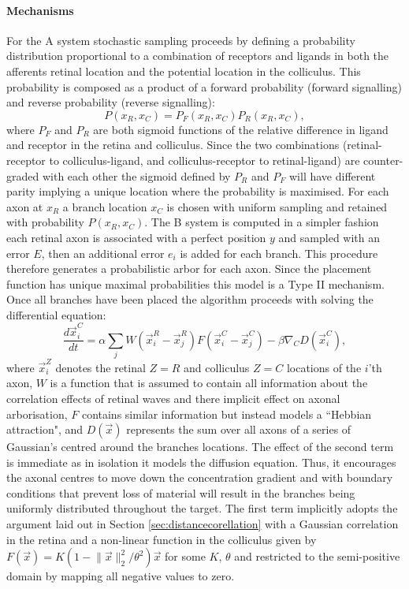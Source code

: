 \paragraph{Mechanisms}
For the A system stochastic sampling proceeds by defining a probability distribution proportional to a combination of receptors and ligands in both the afferents retinal location and the potential location in the colliculus. This probability is composed as a product of a forward probability (forward signalling) and reverse probability (reverse signalling):
\begin{equation}
P(x_R, x_C) = P_F(x_R, x_C)P_R(x_R, x_C),
\end{equation}
where $P_F$ and $P_R$ are both sigmoid functions of the relative difference in ligand and receptor in the retina and colliculus. Since the two combinations (retinal-receptor to colliculus-ligand, and colliculus-receptor to retinal-ligand) are counter-graded with each other the sigmoid defined by $P_R$ and $P_F$ will have different parity implying a unique location where the probability is maximised. For each axon at $x_R$ a branch location $x_C$ is chosen with uniform sampling and retained with probability $P(x_R, x_C)$. The B system is computed in a simpler fashion each retinal axon is associated with a perfect position $y$ and sampled with an error $E$, then an additional error $e_i$ is added for each branch. This procedure therefore generates a probabilistic arbor for each axon. Since the placement function has unique maximal probabilities this model is a Type II mechanism. Once all branches have been placed the algorithm proceeds with solving the differential equation:
\begin{equation}
\frac{d \vec{x}^C_i}{dt} = \alpha \sum_j W(\vec{x}^R_i - \vec{x}^R_j) F(\vec{x}^C_i - \vec{x}^C_j) - \beta \nabla_CD(\vec{x}^C_i),
\end{equation}
where $\vec{x}^Z_i$ denotes the retinal $Z = R$ and colliculus $Z = C$ locations of the $i$'th axon, $W$ is a function that is assumed to contain all information about the correlation effects of retinal waves and there implicit effect on axonal arborisation, $F$ contains similar information but instead models a ``Hebbian attraction", and $D(\vec{x})$ represents the sum over all axons of a series of Gaussian's centred around the branches locations. The effect of the second term is immediate as in isolation it models the diffusion equation. Thus, it encourages the axonal centres to move down the concentration gradient and with boundary conditions that prevent loss of material will result in the branches being uniformly distributed throughout the target. The first term implicitly adopts the argument laid out in Section \ref{sec:distancecorellation} with a Gaussian correlation in the retina and a non-linear function in the colliculus given by $F(\vec{x}) = K(1-\lVert\vec{x}\rVert_2^2/\theta^2)\vec{x}$ for some $K$, $\theta$ and restricted to the semi-positive domain by mapping all negative values to zero.
